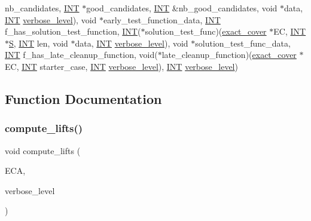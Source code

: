 \begin{DoxyCompactItemize}
nb\+\_\+candidates, \mbox{\hyperlink{galois_8h_a09fddde158a3a20bd2dcadb609de11dc}{I\+NT}} $\ast$good\+\_\+candidates, \mbox{\hyperlink{galois_8h_a09fddde158a3a20bd2dcadb609de11dc}{I\+NT}} \&nb\+\_\+good\+\_\+candidates, void $\ast$data, \mbox{\hyperlink{galois_8h_a09fddde158a3a20bd2dcadb609de11dc}{I\+NT}} \mbox{\hyperlink{simeon_8_c_a818073fbcc2f439e7c56952f67386122}{verbose\+\_\+level}}), void $\ast$early\+\_\+test\+\_\+function\+\_\+data, \mbox{\hyperlink{galois_8h_a09fddde158a3a20bd2dcadb609de11dc}{I\+NT}} f\+\_\+has\+\_\+solution\+\_\+test\+\_\+function, \mbox{\hyperlink{galois_8h_a09fddde158a3a20bd2dcadb609de11dc}{I\+NT}}($\ast$solution\+\_\+test\+\_\+func)(\mbox{\hyperlink{classexact__cover}{exact\+\_\+cover}} $\ast$EC, \mbox{\hyperlink{galois_8h_a09fddde158a3a20bd2dcadb609de11dc}{I\+NT}} $\ast$\mbox{\hyperlink{simeon_8_c_adab47f8243f1b5a2c31df2535d6b37d0}{S}}, \mbox{\hyperlink{galois_8h_a09fddde158a3a20bd2dcadb609de11dc}{I\+NT}} len, void $\ast$data, \mbox{\hyperlink{galois_8h_a09fddde158a3a20bd2dcadb609de11dc}{I\+NT}} \mbox{\hyperlink{simeon_8_c_a818073fbcc2f439e7c56952f67386122}{verbose\+\_\+level}}), void $\ast$solution\+\_\+test\+\_\+func\+\_\+data, \mbox{\hyperlink{galois_8h_a09fddde158a3a20bd2dcadb609de11dc}{I\+NT}} f\+\_\+has\+\_\+late\+\_\+cleanup\+\_\+function, void($\ast$late\+\_\+cleanup\+\_\+function)(\mbox{\hyperlink{classexact__cover}{exact\+\_\+cover}} $\ast$EC, \mbox{\hyperlink{galois_8h_a09fddde158a3a20bd2dcadb609de11dc}{I\+NT}} starter\+\_\+case, \mbox{\hyperlink{galois_8h_a09fddde158a3a20bd2dcadb609de11dc}{I\+NT}} \mbox{\hyperlink{simeon_8_c_a818073fbcc2f439e7c56952f67386122}{verbose\+\_\+level}}), \mbox{\hyperlink{galois_8h_a09fddde158a3a20bd2dcadb609de11dc}{I\+NT}} \mbox{\hyperlink{simeon_8_c_a818073fbcc2f439e7c56952f67386122}{verbose\+\_\+level}})
\end{DoxyCompactItemize}


\subsection{Function Documentation}
\mbox{\label{extra_8_c_a82fe3b66a6f9d9075eb8847d7bfe556b}} 
\subsubsection{\texorpdfstring{compute\+\_\+lifts()}{compute\_lifts()}}
{\footnotesize\ttfamily void compute\+\_\+lifts (\begin{DoxyParamCaption}\item[{\mbox{\hyperlink{classexact__cover__arguments}{exact\+\_\+cover\+\_\+arguments}} $\ast$}]{E\+CA,  }\item[{\mbox{\hyperlink{galois_8h_a09fddde158a3a20bd2dcadb609de11dc}{I\+NT}}}]{verbose\+\_\+level }\end{DoxyParamCaption})}

